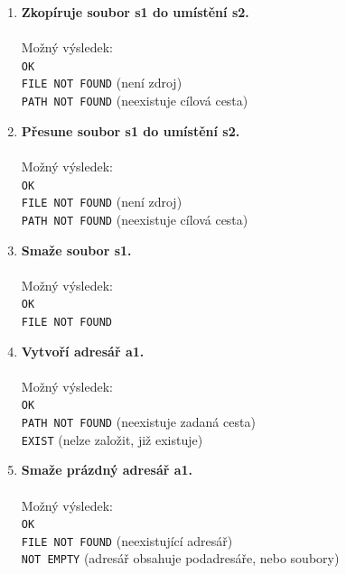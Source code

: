 \documentclass[
11pt,
a4paper,
pdftex,
czech,
titlepage
]{report}
\begin{document}
\begin{enumerate}[label=\textbf{\arabic*}.]
\item \textbf{Zkopíruje soubor s1 do umístění s2.}\\[0,2cm]
\noindent {}\\[0.5\baselineskip]
Možný výsledek:\\
\texttt{OK}\\
\texttt{FILE NOT FOUND} (není zdroj)\\
\texttt{PATH NOT FOUND} (neexistuje cílová cesta)\\

\item \textbf{Přesune soubor s1 do umístění s2.}\\[0,2cm]
\noindent {}\\[0.5\baselineskip]
Možný výsledek:\\
\texttt{OK}\\
\texttt{FILE NOT FOUND} (není zdroj)\\
\texttt{PATH NOT FOUND} (neexistuje cílová cesta)\\

\item \textbf{Smaže soubor s1.}\\[0,2cm]
\noindent {}\\[0.5\baselineskip]
Možný výsledek:\\
\texttt{OK}\\
\texttt{FILE NOT FOUND}\\

\item \textbf{Vytvoří adresář a1.}\\[0,2cm]
\noindent {}\\[0.5\baselineskip]
Možný výsledek:\\
\texttt{OK}\\
\texttt{PATH NOT FOUND} (neexistuje zadaná cesta)\\
\texttt{EXIST} (nelze založit, již existuje)\\

\item \textbf{Smaže prázdný adresář a1.}\\[0,2cm]
\noindent {}\\[0.5\baselineskip]
Možný výsledek:\\
\texttt{OK}\\
\texttt{FILE NOT FOUND} (neexistující adresář)\\
\texttt{NOT EMPTY} (adresář obsahuje podadresáře, nebo soubory)\\


\end{enumerate}
\end{document}
